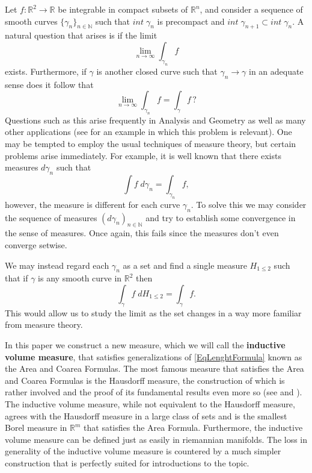 \documentclass[%
 aip,
 amsmath,amssymb,
 reprint,%
jmp]{revtex4-2}
\begin{document}
Let $f\colon \mathbb{R}^{2} \to \mathbb{R}$ be integrable in compact subsets of $\mathbb{R}^{n}$, and consider a sequence of smooth curves $\{\gamma_{n}\}_{n\in\mathbb{N}}$ such that $int\;\gamma_{n}$ is precompact and $int\;\gamma_{n+1} \subset int\;\gamma_{n}$. A natural question that arises is if the limit
\begin{equation*}
    \lim_{n\to\infty} \int_{\gamma_{n}}f
\end{equation*}
exists. Furthermore, if $\gamma$ is another closed curve such that $\gamma_{n} \to \gamma$ in an adequate sense does it follow that
\begin{equation*}
    \lim_{n\to\infty} \int_{\gamma_{n}}f = \int_{\gamma}f\,?
\end{equation*}
Questions such as this arise frequently in Analysis and Geometry as well as many other applications (see \cite{Cedeño} for an example in which this problem is relevant). One may be tempted to employ the usual techniques of measure theory, but certain problems arise immediately. For example, it is well known that there exists measures $d\gamma_{n}$ such that
\begin{equation*}
    \int f\;d\gamma_{n} = \int_{\gamma_{n}} f,
\end{equation*}
however, the measure is different for each curve $\gamma_{n}$. To solve this we may consider the sequence of measures $(d\gamma_{n})_{n\in\mathbb{N}}$ and try to establish some convergence in the sense of measures. Once again, this fails since the measures don't even converge setwise.

We may instead regard each $\gamma_{n}$ as a set and find a single measure $H_{1\leq 2}$ such that if $\gamma$ is any smooth curve in $\mathbb{R}^{2}$ then
\begin{equation}\label{EqLenghtFormula}
    \int_{\gamma}f\;dH_{1\leq 2} = \int_{\gamma} f.
\end{equation}
This would allow us to study the limit as the set changes in a way more familiar from measure theory.

In this paper we construct a new measure, which we will call the \textbf{inductive volume measure}, that satisfies generalizations of \eqref{EqLenghtFormula} known as the Area and Coarea Formulas. The most famous measure that satisfies the Area and Coarea Formulas is the Hausdorff measure, the construction of which is rather involved and the proof of its fundamental results even more so (see \cite{Federer} and \cite{Evans}). The inductive volume measure, while not equivalent to the Hausdorff measure, agrees with the Hausdorff measure in a large class of sets and is the smallest Borel measure in $\mathbb{R}^{m}$ that satisfies the Area Formula. Furthermore, the inductive volume measure can be defined just as easily in riemannian manifolds. The loss in generality of the inductive volume measure is countered by a much simpler construction that is perfectly suited for introductions to the topic.
\end{document}
